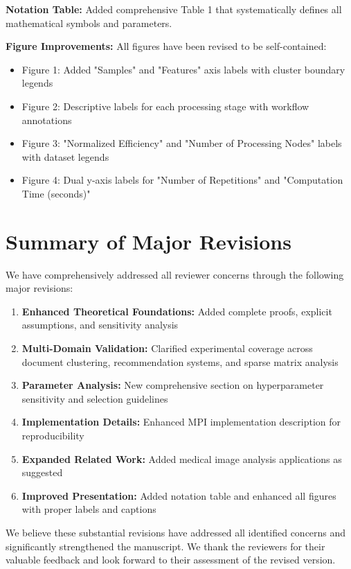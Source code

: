 \documentclass{ar2rc}
\begin{document}


\textbf{Notation Table:} Added comprehensive Table 1 that systematically defines all mathematical symbols and parameters.

\textbf{Figure Improvements:} All figures have been revised to be self-contained:
\begin{itemize}
  \item Figure 1: Added "Samples" and "Features" axis labels with cluster boundary legends
  \item Figure 2: Descriptive labels for each processing stage with workflow annotations
  \item Figure 3: "Normalized Efficiency" and "Number of Processing Nodes" labels with dataset legends
  \item Figure 4: Dual y-axis labels for "Number of Repetitions" and "Computation Time (seconds)"
\end{itemize}


\section{Summary of Major Revisions}

We have comprehensively addressed all reviewer concerns through the following major revisions:

\begin{enumerate}
  \item \textbf{Enhanced Theoretical Foundations:} Added complete proofs, explicit assumptions, and sensitivity analysis
  \item \textbf{Multi-Domain Validation:} Clarified experimental coverage across document clustering, recommendation systems, and sparse matrix analysis
  \item \textbf{Parameter Analysis:} New comprehensive section on hyperparameter sensitivity and selection guidelines
  \item \textbf{Implementation Details:} Enhanced MPI implementation description for reproducibility
  \item \textbf{Expanded Related Work:} Added medical image analysis applications as suggested
  \item \textbf{Improved Presentation:} Added notation table and enhanced all figures with proper labels and captions
\end{enumerate}

We believe these substantial revisions have addressed all identified concerns and significantly strengthened the manuscript. We thank the reviewers for their valuable feedback and look forward to their assessment of the revised version.

\printbibliography
\end{document}
